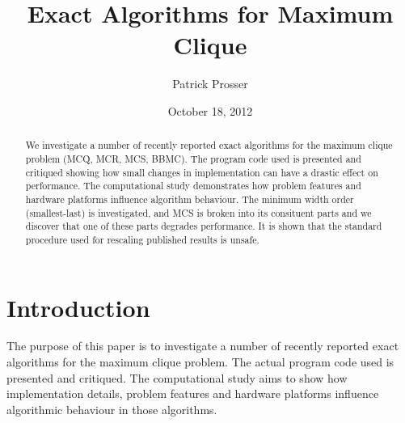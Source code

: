 \documentclass{l4proj}
\begin{document}
\title{Exact Algorithms for Maximum Clique}
\author{Patrick Prosser}
\date{October 18, 2012}
\maketitle

\begin{abstract}
We investigate a number of recently reported exact algorithms for the maximum clique problem (MCQ, MCR, MCS, BBMC). 
The program code used is presented and critiqued showing how small changes in implementation can have a drastic effect on performance. 
The computational study demonstrates how problem features and hardware platforms influence algorithm behaviour. 
The minimum width order (smallest-last) is investigated, and MCS is broken into its consituent parts and we discover that 
one of these parts degrades performance. It is shown that the standard procedure used for rescaling published results is unsafe. 
\end{abstract}

\educationalconsent
%
%
\tableofcontents


\lstset{ %
language=Java,              %
basicstyle=\scriptsize,     %
numbers=left,               %
numberstyle=\scriptsize,    %
numbersep=10pt,             %
frame=trBL,                 %
captionpos=b,               %
breaklines=true,            %
breakatwhitespace=false,    %
showstringspaces=false,     %
frameround=fttt
}

%
\chapter{Introduction}
\label{sec:intro}
\vspace{-1.5mm}
The purpose of this paper is to investigate a number of recently reported exact algorithms for the
maximum clique problem. The actual program code used is presented and critiqued. 
The computational study aims to show how implementation details, problem features and hardware platforms influence
algorithmic behaviour in those algorithms.\\
\end{document}
